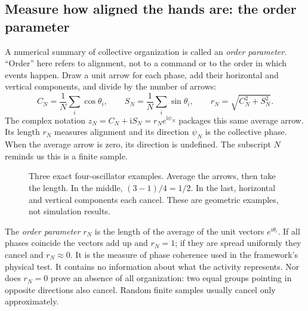 \documentclass[11pt]{article}
\begin{document}
\subsection{Measure how aligned the hands are: the order parameter}

A numerical summary of collective organization is called an \emph{order
parameter}. ``Order'' here refers to alignment, not to a command or to the
order in which events happen. Draw a unit arrow for each phase, add their
horizontal and vertical components, and divide by the number of arrows:
\[
 C_N=\frac1N\sum_i\cos\theta_i,\qquad
 S_N=\frac1N\sum_i\sin\theta_i,\qquad
 r_N=\sqrt{C_N^2+S_N^2}.
\]
The complex notation $z_N=C_N+\mathrm{i}S_N=r_Ne^{\mathrm{i}\psi_N}$ packages
this same average arrow. Its length $r_N$ measures alignment and its direction
$\psi_N$ is the collective phase. When the average arrow is zero, its
direction is undefined. The subscript $N$ reminds us this is a finite sample.

\begin{figure}[htbp]
\centering
{}
\caption{Three exact four-oscillator examples. Average the arrows, then take
the length. In the middle, $(3-1)/4=1/2$. In the last, horizontal and vertical
components each cancel. These are geometric examples, not simulation results.}
\label{fig:primer-order}
\end{figure}

The \emph{order parameter} $r_N$ is the length of the average of the unit
vectors $e^{i\theta_i}$. If all phases coincide the vectors add up and
$r_N=1$; if they are spread uniformly they cancel and $r_N\approx0$. It is the
measure of phase coherence used in the framework's physical test. It contains
no information about what the activity represents. Nor does $r_N=0$ prove an
absence of all organization: two equal groups pointing in opposite directions
also cancel. Random finite samples usually cancel only approximately.
\end{document}

